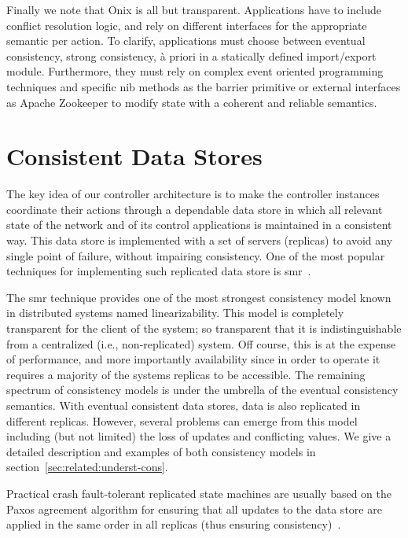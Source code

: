 Finally we note that Onix is all but transparent. 
Applications have to include conflict resolution logic, and rely on different interfaces for the appropriate semantic per action. 
To clarify, applications must choose between eventual consistency, strong consistency, à priori in a statically defined import/export module. 
Furthermore, they must rely on complex event oriented programming techniques and specific \gls{nib} methods as the barrier primitive or external interfaces as Apache Zookeeper to modify state with a coherent and reliable semantics. 

\glsresetall
\section{Consistent Data Stores}
\label{sec:related:cons-data-stor}

The key idea of our controller architecture is to make the controller instances coordinate their actions through a dependable data store in which all relevant state of the network and of its control applications is maintained in a consistent way.
This data store is implemented with a set of servers (replicas) to avoid any single point of failure, without impairing consistency.
One of the most popular techniques for implementing such replicated data store is \gls{smr}~\cite{Schneider:1990vy,Lam98}.

The  \gls{smr} technique provides one of the most strongest consistency model known in distributed systems named linearizability. 
This model is completely transparent for the client of the system; so transparent that it is indistinguishable from a centralized (i.e., non-replicated) system. 
Off course, this is at the expense of performance, and more importantly availability since in order to operate it requires a majority of the systems replicas to be accessible. 
The remaining spectrum of consistency models is under the umbrella of the eventual consistency semantics. 
With eventual consistent data stores, data is also replicated in different replicas. 
However, several problems can emerge from this model including (but not limited) the loss of updates and  conflicting values. 
We give a detailed description and examples of both consistency models in section~\ref{sec:related:underst-cons}.

Practical crash fault-tolerant replicated state machines are usually based on the Paxos agreement algorithm for ensuring that all updates to the data store are applied in the same order in all replicas (thus ensuring consistency)~\cite{Lam98}. 

